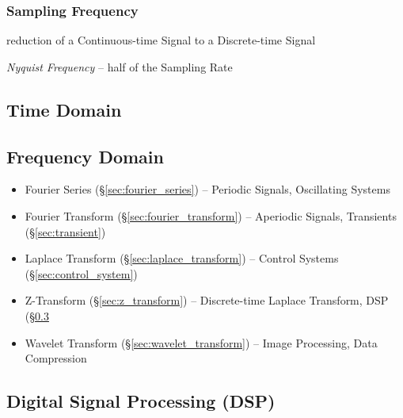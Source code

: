 \subsubsection{Sampling Frequency}\label{sec:sampling_frequency}

reduction of a Continuous-time Signal to a Discrete-time Signal

\emph{Nyquist Frequency} -- half of the Sampling Rate



\subsection{Time Domain}\label{sec:time_domain}

\subsection{Frequency Domain}\label{sec:frequency_domain}

\begin{itemize}
  \item Fourier Series (\S\ref{sec:fourier_series}) -- Periodic Signals,
    Oscillating Systems
  \item Fourier Transform (\S\ref{sec:fourier_transform}) -- Aperiodic Signals,
    Transients (\S\ref{sec:transient})
  \item Laplace Transform (\S\ref{sec:laplace_transform}) -- Control Systems
    (\S\ref{sec:control_system})
  \item Z-Transform (\S\ref{sec:z_transform}) -- Discrete-time Laplace
    Transform, DSP (\S\ref{sec:dsp}
  \item Wavelet Transform (\S\ref{sec:wavelet_transform}) -- Image Processing,
    Data Compression
\end{itemize}



\subsection{Digital Signal Processing (DSP)}\label{sec:dsp}

